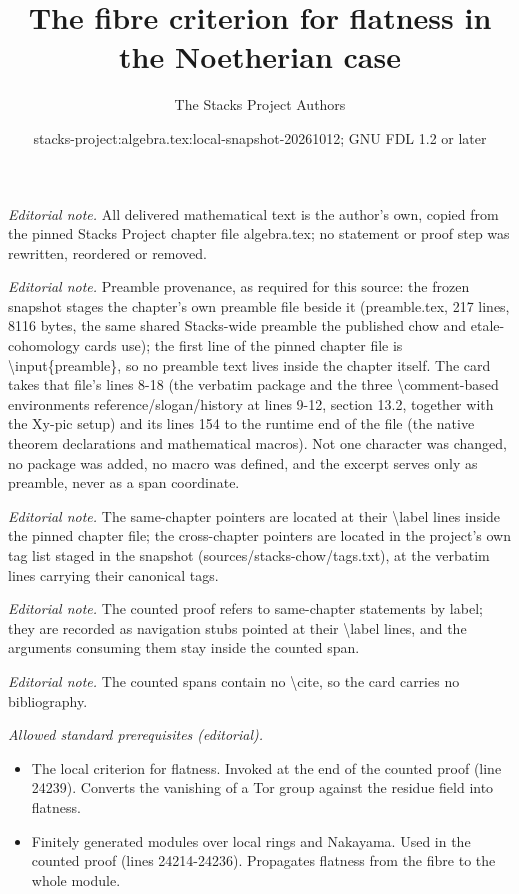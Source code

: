 \documentclass[10pt,a4paper]{amsart}
\title{The fibre criterion for flatness in the Noetherian case}
\author{The Stacks Project Authors}
\date{stacks-project:algebra.tex:local-snapshot-20261012; GNU FDL 1.2 or later}
\theoremstyle{plain}
\theoremstyle{definition}
\theoremstyle{remark}
\numberwithin{equation}{subsection}
\begin{document}
\maketitle
\noindent\textit{Editorial note.} All delivered mathematical text is the author's own, copied from the pinned Stacks Project chapter file algebra.tex; no statement or proof step was rewritten, reordered or removed.\par\medskip
\noindent\textit{Editorial note.} Preamble provenance, as required for this source: the frozen snapshot stages the chapter's own preamble file beside it (preamble.tex, 217 lines, 8116 bytes, the same shared Stacks-wide preamble the published chow and etale-cohomology cards use); the first line of the pinned chapter file is \textbackslash{}input\{preamble\}, so no preamble text lives inside the chapter itself. The card takes that file's lines 8-18 (the verbatim package and the three \textbackslash{}comment-based environments reference/slogan/history at lines 9-12, section 13.2, together with the Xy-pic setup) and its lines 154 to the runtime end of the file (the native theorem declarations and mathematical macros). Not one character was changed, no package was added, no macro was defined, and the excerpt serves only as preamble, never as a span coordinate.\par\medskip
\noindent\textit{Editorial note.} The same-chapter pointers are located at their \textbackslash{}label lines inside the pinned chapter file; the cross-chapter pointers are located in the project's own tag list staged in the snapshot (sources/stacks-chow/tags.txt), at the verbatim lines carrying their canonical tags.\par\medskip
\noindent\textit{Editorial note.} The counted proof refers to same-chapter statements by label; they are recorded as navigation stubs pointed at their \textbackslash{}label lines, and the arguments consuming them stay inside the counted span.\par\medskip
\noindent\textit{Editorial note.} The counted spans contain no \textbackslash{}cite, so the card carries no bibliography.\par\medskip
\noindent\textit{Allowed standard prerequisites (editorial).}\begin{itemize}
\item The local criterion for flatness. Invoked at the end of the counted proof (line 24239). Converts the vanishing of a Tor group against the residue field into flatness.
\item Finitely generated modules over local rings and Nakayama. Used in the counted proof (lines 24214-24236). Propagates flatness from the fibre to the whole module.
\end{itemize}\medskip
\end{document}
